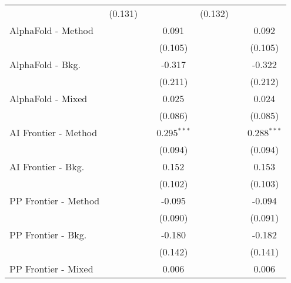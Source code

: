 \begin{tabular}{lcccccc}
                                & (0.131)       &              &               & (0.132)       &              &   \\   
   AlphaFold - Method           &               &              & 0.091         &               &              & 0.092\\   
                                &               &              & (0.105)       &               &              & (0.105)\\   
   AlphaFold - Bkg.             &               &              & -0.317        &               &              & -0.322\\   
                                &               &              & (0.211)       &               &              & (0.212)\\   
   AlphaFold - Mixed            &               &              & 0.025         &               &              & 0.024\\   
                                &               &              & (0.086)       &               &              & (0.085)\\   
   AI Frontier - Method         &               &              & 0.295$^{***}$ &               &              & 0.288$^{***}$\\   
                                &               &              & (0.094)       &               &              & (0.094)\\   
   AI Frontier - Bkg.           &               &              & 0.152         &               &              & 0.153\\   
                                &               &              & (0.102)       &               &              & (0.103)\\   
   PP Frontier - Method         &               &              & -0.095        &               &              & -0.094\\   
                                &               &              & (0.090)       &               &              & (0.091)\\   
   PP Frontier - Bkg.           &               &              & -0.180        &               &              & -0.182\\   
                                &               &              & (0.142)       &               &              & (0.141)\\   
   PP Frontier - Mixed          &               &              & 0.006         &               &              & 0.006\\   

\end{tabular}

